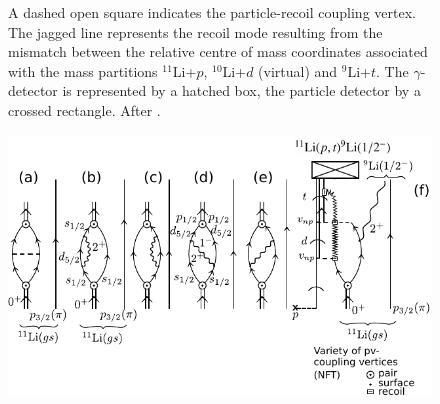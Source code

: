 \begin{figure}
{              	 A dashed open square  indicates the particle-recoil coupling vertex.
              	   The jagged line  represents the recoil  mode resulting from the mismatch between the relative centre of mass coordinates  associated with  the mass partitions $^{11}$Li+$p$, $^{10}$Li+$d$ (virtual) and  $^9$Li+$t$. 
              	 The $\gamma$-detector is represented by a hatched box, the  particle detector  by a crossed rectangle. After \cite{Broglia:16}.}
          \label{fig1.9.3}
          \end{figure}
          \begin{figure}
          \centerline {
          \includegraphics*[width=12cm]{introduccion/figs/figintro5xx}
          }

\end{figure}
